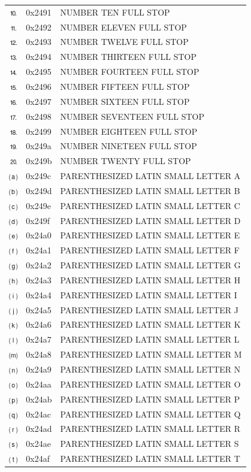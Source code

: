 \documentclass[12pt, twoside]{article}
\begin{document}
\begin{longtable}{L{1.0cm} L{2.0cm} >{\footnotesize}L{10cm}}
$⒑$&0x2491&NUMBER TEN FULL STOP\\
$⒒$&0x2492&NUMBER ELEVEN FULL STOP\\
$⒓$&0x2493&NUMBER TWELVE FULL STOP\\
$⒔$&0x2494&NUMBER THIRTEEN FULL STOP\\
$⒕$&0x2495&NUMBER FOURTEEN FULL STOP\\
$⒖$&0x2496&NUMBER FIFTEEN FULL STOP\\
$⒗$&0x2497&NUMBER SIXTEEN FULL STOP\\
$⒘$&0x2498&NUMBER SEVENTEEN FULL STOP\\
$⒙$&0x2499&NUMBER EIGHTEEN FULL STOP\\
$⒚$&0x249a&NUMBER NINETEEN FULL STOP\\
$⒛$&0x249b&NUMBER TWENTY FULL STOP\\
$⒜$&0x249c&PARENTHESIZED LATIN SMALL LETTER A\\
$⒝$&0x249d&PARENTHESIZED LATIN SMALL LETTER B\\
$⒞$&0x249e&PARENTHESIZED LATIN SMALL LETTER C\\
$⒟$&0x249f&PARENTHESIZED LATIN SMALL LETTER D\\
$⒠$&0x24a0&PARENTHESIZED LATIN SMALL LETTER E\\
$⒡$&0x24a1&PARENTHESIZED LATIN SMALL LETTER F\\
$⒢$&0x24a2&PARENTHESIZED LATIN SMALL LETTER G\\
$⒣$&0x24a3&PARENTHESIZED LATIN SMALL LETTER H\\
$⒤$&0x24a4&PARENTHESIZED LATIN SMALL LETTER I\\
$⒥$&0x24a5&PARENTHESIZED LATIN SMALL LETTER J\\
$⒦$&0x24a6&PARENTHESIZED LATIN SMALL LETTER K\\
$⒧$&0x24a7&PARENTHESIZED LATIN SMALL LETTER L\\
$⒨$&0x24a8&PARENTHESIZED LATIN SMALL LETTER M\\
$⒩$&0x24a9&PARENTHESIZED LATIN SMALL LETTER N\\
$⒪$&0x24aa&PARENTHESIZED LATIN SMALL LETTER O\\
$⒫$&0x24ab&PARENTHESIZED LATIN SMALL LETTER P\\
$⒬$&0x24ac&PARENTHESIZED LATIN SMALL LETTER Q\\
$⒭$&0x24ad&PARENTHESIZED LATIN SMALL LETTER R\\
$⒮$&0x24ae&PARENTHESIZED LATIN SMALL LETTER S\\
$⒯$&0x24af&PARENTHESIZED LATIN SMALL LETTER T\\

\end{longtable}
\end{document}
